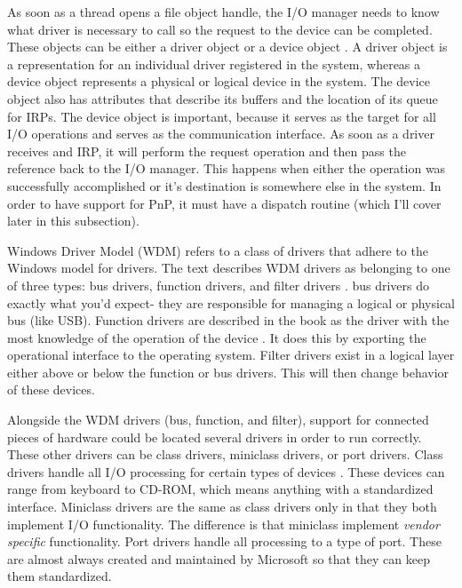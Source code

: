 \par As soon as a thread opens a file object handle, the I/O manager needs to know what driver is necessary to call so the request to the device can be completed.
These objects can be either a driver object or a device object \cite{win:2}.
A driver object is a representation for an individual driver registered in the system, whereas a device object represents a physical or logical device in the system.
The device object also has attributes that describe its buffers and the location of its queue for IRPs.
The device object is important, because it serves as the target for all I/O operations and serves as the communication interface.
As soon as a driver receives and IRP, it will perform the request operation and then pass the reference back to the I/O manager.
This happens when either the operation was successfully accomplished or it's destination is somewhere else in the system.
In order to have support for PnP, it must have a dispatch routine (which I'll cover later in this subsection).

\par Windows Driver Model (WDM) refers to a class of drivers that adhere to the Windows model for drivers.
The text describes WDM drivers as belonging to one of three types: bus drivers, function drivers, and filter drivers \cite{win:2}.
bus drivers do exactly what you'd expect- they are responsible for managing a logical or physical bus (like USB).
Function drivers are described in the book as the driver with the most knowledge of the operation of the device \cite{win:2}.
It does this by exporting the operational interface to the operating system.
Filter drivers exist in a logical layer either above or below the function or bus drivers.
This will then change behavior of these devices.

\par Alongside the WDM drivers (bus, function, and filter), support for connected pieces of hardware could be located several drivers in order to run correctly.
These other drivers can be class drivers, miniclass drivers, or port drivers.
Class drivers handle all I/O processing for certain types of devices \cite{win:2}.
These devices can range from keyboard to CD-ROM, which means anything with a standardized interface.
Miniclass drivers are the same as class drivers only in that they both implement I/O functionality.
The difference is that miniclass implement \textit{vendor specific} functionality.
Port drivers handle all processing to a type of port.
These are almost always created and maintained by Microsoft so that they can keep them standardized.

